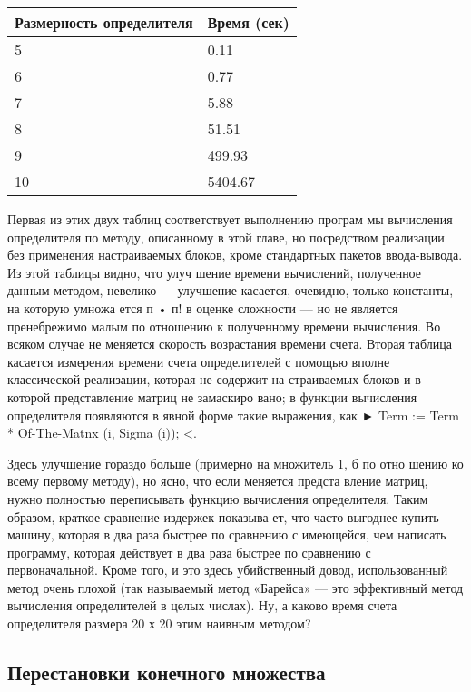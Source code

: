 \documentclass{../../template/mai_book}
\begin{document}
{\begin{multicols}{2}
\columnbreak

\begin{tabular}{|p{2.75cm}|p{2.75cm}|}
\hline
Размерность определителя & Время  (сек) \\ \hline
5 & 0.11 \\
6 & 0.77 \\
7 & 5.88 \\
8 & 51.51 \\
9 & 499.93 \\
10 & 5404.67 \\ \hline
\end{tabular}
\end{multicols}

Первая из этих двух таблиц соответствует выполнению програм­
мы вычисления определителя по методу, описанному в этой главе, но
посредством реализации без применения настраиваемых блоков, кроме
стандартных пакетов ввода-вывода. Из этой таблицы видно, что улуч­
шение времени вычислений, полученное данным методом, невелико —
улучшение касается, очевидно, только константы, на которую умножа­
ется п • п! в оценке сложности — но не является пренебрежимо малым
по отношению к полученному времени вычисления. Во всяком случае
не меняется скорость возрастания времени счета.
Вторая таблица касается измерения времени счета определителей
с помощью вполне классической реализации, которая не содержит на­
страиваемых блоков и в которой представление матриц не замаскиро­
вано; в функции вычисления определителя появляются в явной форме
такие выражения, как ► Term := Term * Of-The-Matnx (i, Sigma (i)); <.

\newpage

Здесь улучшение гораздо больше (примерно на множитель 1, б по отно­
шению ко всему первому методу), но ясно, что если меняется предста­
вление матриц, нужно полностью переписывать функцию вычисления
определителя. Таким образом, краткое сравнение издержек показыва­
ет, что часто выгоднее купить машину, которая в два раза быстрее по
сравнению с имеющейся, чем написать программу, которая действует
в два раза быстрее по сравнению с первоначальной. Кроме того, и это
здесь убийственный довод, использованный метод очень плохой (так
называемый метод «Барейса» — это эффективный метод вычисления
определителей в целых числах).
Ну, а каково время счета определителя размера 20 х 20 этим наивным
методом?

\subsection{Перестановки конечного множества}

}
\end{document}
